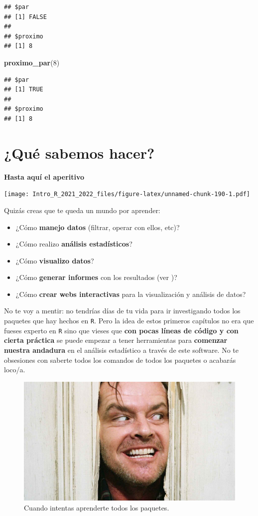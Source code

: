 \documentclass[11pt,]{book}
\newenvironment{Shaded}{\begin{snugshade}}{\end{snugshade}}
\newcommand{\DecValTok}[1]{\textcolor[rgb]{0.06,0.06,0.06}{#1}}
\newcommand{\KeywordTok}[1]{\textcolor[rgb]{0.27,0.27,0.27}{\textbf{#1}}}
\newcommand{\NormalTok}[1]{#1}
\providecommand{\tightlist}{%
  \setlength{\itemsep}{0pt}\setlength{\parskip}{0pt}}
\begin{document}
\begin{verbatim}
## $par
## [1] FALSE
## 
## $proximo
## [1] 8
\end{verbatim}

\begin{Shaded}
\begin{Highlighting}[]
\KeywordTok{proximo_par}\NormalTok{(}\DecValTok{8}\NormalTok{)}
\end{Highlighting}
\end{Shaded}

\begin{verbatim}
## $par
## [1] TRUE
## 
## $proximo
## [1] 8
\end{verbatim}

\hypertarget{quuxe9-sabemos-hacer}{%
\chapter{¿Qué sabemos hacer?}\label{quuxe9-sabemos-hacer}}

\textbf{Hasta aquí el aperitivo}

\texttt{[image: Intro\_R\_2021\_2022\_files/figure-latex/unnamed-chunk-190-1.pdf]}

Quizás creas que te queda un mundo por aprender:

\begin{itemize}
\tightlist
\item
  ¿Cómo \textbf{manejo datos} (filtrar, operar con ellos, etc)?
\item
  ¿Cómo realizo \textbf{análisis estadísticos}?
\item
  ¿Cómo \textbf{visualizo datos}?
\item
  ¿Cómo \textbf{generar informes} con los resultados (ver \citep{xie2015})?
\item
  ¿Cómo \textbf{crear webs interactivas} para la visualización y análisis de datos?
\end{itemize}

No te voy a mentir: no tendrías días de tu vida para ir investigando todos los paquetes que hay hechos en \texttt{R}. Pero la idea de estos primeros capítulos no era que fueses experto en \texttt{R} sino que vieses que \textbf{con pocas líneas de código y con cierta práctica} se puede empezar a tener herramientas para \textbf{comenzar nuestra andadura} en el análisis estadístico a través de este software. No te obsesiones con saberte todos los comandos de todos los paquetes o acabarás loco/a.

\begin{figure}

{\centering \includegraphics[width=0.5\linewidth]{./img/stanley_kubrick} 

}

\caption{Cuando intentas aprenderte todos los paquetes.}\label{fig:unnamed-chunk-191}
\end{figure}
\end{document}
